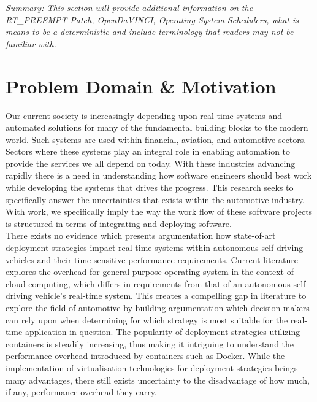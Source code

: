 \textit{Summary: This section will provide additional information on the RT\_PREEMPT Patch, OpenDaVINCI, Operating System Schedulers, what is means to be a deterministic and include terminology that readers may not be familiar with.}



\section{Problem Domain \& Motivation}
Our current society is increasingly depending upon real-time systems and automated solutions for many of the fundamental building blocks to the modern world. Such systems are used within financial, aviation, and automotive sectors. Sectors where these systems play an integral role in enabling automation to provide the services we all depend on today. With these industries advancing rapidly there is a need in understanding how software engineers should best work while developing the systems that drives the progress. This research seeks to specifically answer the uncertainties that exists within the automotive industry. With work, we specifically imply the way the work flow of these software projects is structured in terms of integrating and deploying software.\\

There exists no evidence which presents argumentation how state-of-art deployment strategies impact real-time systems within autonomous self-driving vehicles and their time sensitive performance requirements. Current literature \cite{vmvscontainers} explores the overhead for general purpose operating system in the context of cloud-computing, which differs in requirements from that of an autonomous self-driving vehicle's real-time system. This creates a compelling gap in literature to explore the field of automotive by building argumentation which decision makers can rely upon when determining for which strategy is most suitable for the real-time application in question. The popularity of deployment strategies utilizing containers is steadily increasing, thus making it intriguing to understand the performance overhead introduced by containers such as Docker. While the implementation of virtualisation technologies for deployment strategies brings many advantages, there still exists uncertainty to the disadvantage of how much, if any, performance overhead they carry.\\

